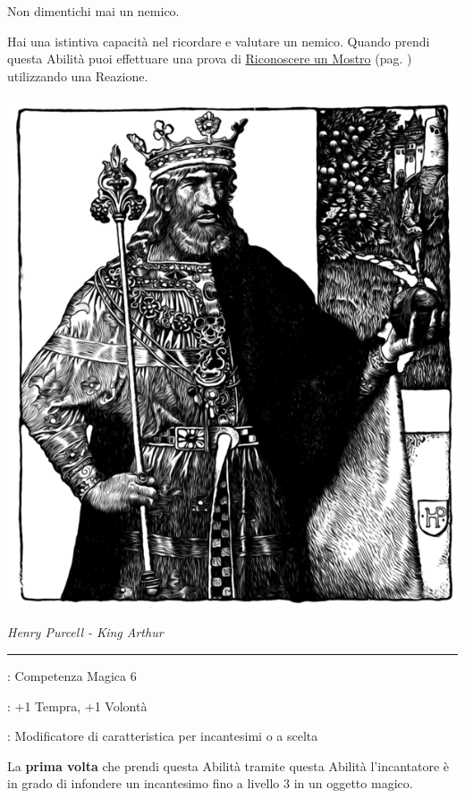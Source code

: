 \begin{multicols}{2}
Non dimentichi mai un nemico.

Hai una istintiva capacità nel ricordare e valutare un nemico. Quando prendi questa Abilità puoi effettuare una prova di \hyperlink{riconoscereimostri}{Riconoscere un Mostro} (pag. \pageref{riconoscereimostri}) utilizzando una Reazione.


\begin{center}
	\includegraphics[width=0.8\linewidth]{immagini/oggettimagiciuomo.png}

	\emph{Henry Purcell - King Arthur}
\end{center}

\smallskip\noindent\rule{\linewidth}{2pt} \hypertarget{Creare Oggetti Magici}{}\medskip{}
\noindent
\begin{description}[noitemsep, topsep=0pt, parsep=0pt, partopsep=0pt, leftmargin=0cm, labelwidth=2.5cm]
    \item[\textbf{Requisito}]: Competenza Magica 6
    \item[\textbf{Tiri Salvezza}]: +1 Tempra, +1 Volontà
    \item[\textbf{Caratteristica}]: Modificatore di caratteristica per incantesimi o a scelta
\end{description}

La \textbf{prima volta} che prendi questa Abilità tramite questa Abilità l'incantatore è in grado di infondere un incantesimo fino a livello 3 in un oggetto magico.


\end{multicols}
